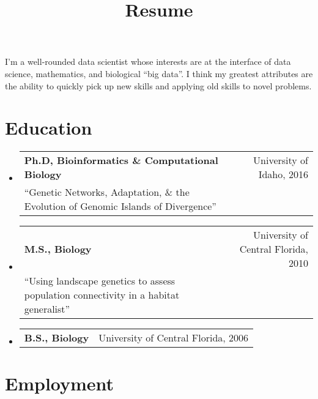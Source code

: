 \documentclass[11pt,letterpaper,sans]{moderncv}        %
\title{Resume }                               %
\begin{document}
\makecvtitle

\small{I'm a well-rounded data scientist whose interests are at the interface of data science, mathematics, and biological ``big data''. I think my greatest attributes are the ability to quickly pick up new skills and applying old skills to novel problems.}
\section{Education}

\begin{itemize}
\item{
\centering
  \begin{tabular}{p{14.4cm}r}
\textbf{Ph.D, Bioinformatics \& Computational Biology} & University of Idaho, 2016\\
``Genetic Networks, Adaptation, \& the Evolution of Genomic Islands of Divergence'' & \\
  \end{tabular}
}

\item{
\centering
  \begin{tabular}{p{13cm}r}
\textbf{M.S., Biology} & University of Central Florida, 2010\\
``Using landscape genetics to assess population connectivity in a habitat generalist'' & \\
  \end{tabular}
}

\item{
\centering
  \begin{tabular}{p{13cm}r}
\textbf{B.S., Biology} & University of Central Florida, 2006\\
  \end{tabular}
}

\end{itemize}

\section{Employment}
\end{document}
